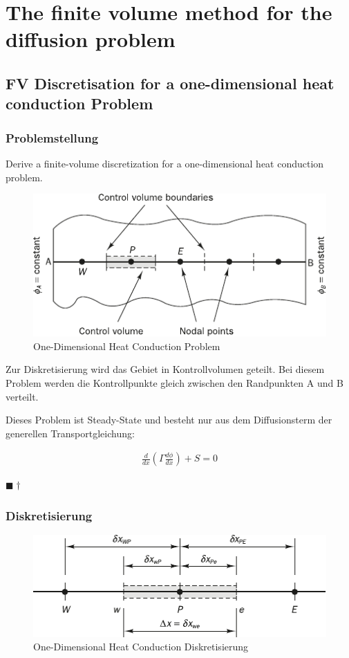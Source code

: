 \documentclass[a4paper]{scrartcl}
\newcommand{\qed}{\begin{flushright}
$\blacksquare \dagger$ \end{flushright}}
\begin{document}

\section{The finite volume method for the diffusion problem}


\subsection{FV Discretisation for a one-dimensional heat conduction Problem}
\subsubsection{Problemstellung}
Derive a finite-volume discretization for a one-dimensional heat conduction
problem. 

\begin{figure}[h]
\begin{center}
\includegraphics[scale=1]{images/41.pdf}
\caption{One-Dimensional Heat Conduction Problem}
\label{fig:41}
\end{center}
\end{figure}
Zur Diskretisierung wird das Gebiet in Kontrollvolumen geteilt. Bei diesem
Problem werden die Kontrollpunkte gleich zwischen den Randpunkten A und B
verteilt.

 Dieses Problem ist Steady-State und besteht nur aus dem Diffusionsterm der
 generellen Transportgleichung:
 
 \begin{align}
 \frac{d}{dx} \left( \Gamma \frac{d\phi}{dx}\right) + S = 0
 \end{align}
 \qed

\subsubsection{Diskretisierung}


\begin{figure}[h]
\begin{center}
\includegraphics[scale=1.2]{images/42.pdf}
\caption{One-Dimensional Heat Conduction Diskretisierung}
\label{fig:42}
\end{center}
\end{figure}
\end{document}
